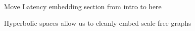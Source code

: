 \documentclass[11pt,conference]{IEEEtran}
\begin{document}
Move Latency embedding section from intro to here








Hyperbolic spaces allow us to cleanly embed scale free graphs



\end{document}
